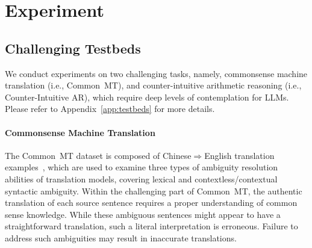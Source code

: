 \section{Experiment}

\subsection{Challenging Testbeds}

We conduct experiments on two challenging tasks, namely, commonsense machine translation (i.e., Common~MT), and counter-intuitive arithmetic reasoning (i.e., Counter-Intuitive AR), which require deep levels of contemplation for LLMs. Please refer to Appendix~\ref{app:testbeds} for more details.

\paragraph{Commonsense Machine Translation}
The Common~MT dataset is composed of Chinese$\Rightarrow$English translation examples~\citep{he-etal-2020-box}, which are used to examine three types of ambiguity resolution abilities of translation models, covering lexical
and contextless/contextual syntactic ambiguity. Within the challenging part of Common~MT, the authentic translation of each source sentence requires a proper understanding of common sense knowledge. While these ambiguous sentences might appear to have a straightforward translation, such a literal interpretation is erroneous. Failure to address such ambiguities may result in inaccurate translations.

